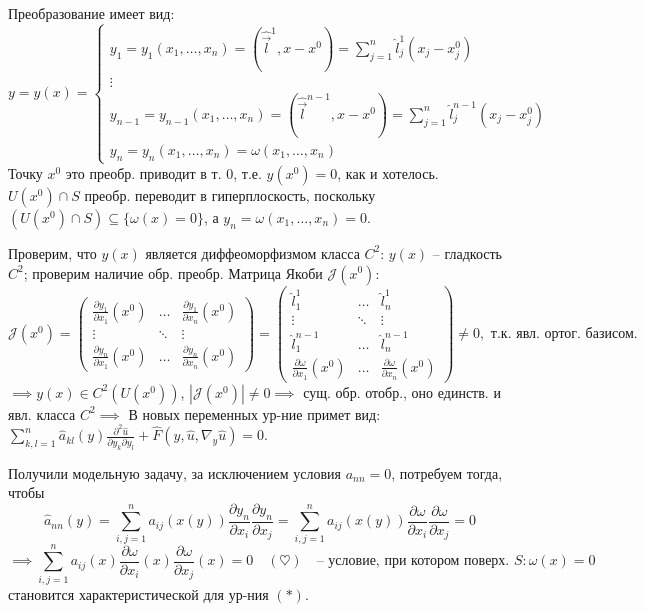 \documentclass[12pt, a4paper]{article}
\begin{document}
Преобразование имеет вид:
\[
y=y(x) = \begin{cases}
y_1 = y_1(x_1, \dots, x_n) = (\hat{\vec{l}}^1, x-x^0) = \sum_{j=1}^n \hat{l}^1_j (x_j-x_j^0) \\
\vdots \\
y_{n-1} = y_{n-1}(x_1, \dots, x_n) = (\hat{\vec{l}}^{n-1}, x-x^0) = \sum_{j=1}^n \hat{l}^{n-1}_j (x_j-x_j^0) \\
y_n = y_n(x_1, \dots, x_n) = \omega(x_1, \dots, x_n)
\end{cases}
\]
Точку $x^0$ это преобр. приводит в т. $0$, т.е. $y(x^0)=0$, как и хотелось.
$U(x^0) \cap S$ преобр. переводит в гиперплоскость, поскольку $(U(x^0) \cap S) \subseteq \{\omega(x)=0\}$, а $y_n = \omega(x_1, \dots, x_n) = 0$.

Проверим, что $y(x)$ является диффеоморфизмом класса $C^2$: $y(x)$ -- гладкость $C^2$; проверим наличие обр. преобр.
Матрица Якоби $\mathcal{J}(x^0)$:
\[
\mathcal{J}(x^0) = \begin{pmatrix}
\frac{\partial y_1}{\partial x_1}(x^0) & \dots & \frac{\partial y_1}{\partial x_n}(x^0) \\
\vdots & \ddots & \vdots \\
\frac{\partial y_n}{\partial x_1}(x^0) & \dots & \frac{\partial y_n}{\partial x_n}(x^0)
\end{pmatrix}
= \begin{pmatrix}
\hat{l}^1_1 & \dots & \hat{l}^1_n \\
\vdots & \ddots & \vdots \\
\hat{l}^{n-1}_1 & \dots & \hat{l}^{n-1}_n \\
\frac{\partial \omega}{\partial x_1}(x^0) & \dots & \frac{\partial \omega}{\partial x_n}(x^0)
\end{pmatrix} \ne 0, \text{ т.к. явл. ортог. базисом.}
\]
$\implies y(x) \in C^2(U(x^0))$, $|\mathcal{J}(x^0)| \ne 0 \implies$ сущ. обр. отобр., оно единств. и явл. класса $C^2 \implies$
В новых переменных ур-ние примет вид: $\sum_{k,l=1}^n \hat{a}_{kl}(y) \frac{\partial^2 \hat{u}}{\partial y_k \partial y_l} + \hat{F}(y, \hat{u}, \nabla_y \hat{u}) = 0$.

Получили модельную задачу, за исключением условия $a_{nn}=0$, потребуем тогда, чтобы
\[
\hat{a}_{nn}(y) = \sum_{i,j=1}^n a_{ij}(x(y)) \frac{\partial y_n}{\partial x_i} \frac{\partial y_n}{\partial x_j} = \sum_{i,j=1}^n a_{ij}(x(y)) \frac{\partial \omega}{\partial x_i} \frac{\partial \omega}{\partial x_j} = 0
\]
\[
\implies \boxed{ \sum_{i,j=1}^n a_{ij}(x) \frac{\partial \omega}{\partial x_i}(x) \frac{\partial \omega}{\partial x_j}(x) = 0 \quad (\heartsuit) } \quad \text{-- условие, при котором поверх. } S: \omega(x)=0
\]
становится характеристической для ур-ния $(*)$.
\end{document}
